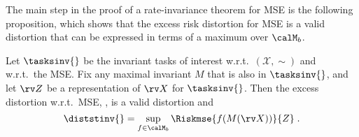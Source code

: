 \documentclass[final]{article}
\begin{document}
The main step in the proof of a rate-invariance theorem for MSE is the following proposition, which shows that the excess risk distortion for MSE is a valid distortion that can be expressed in terms of a maximum over $\calM_b$.










\begin{proposition}\label{appx:prop:invariant_distortion_mse}
Let $\tasksinv{}$ be the invariant tasks of interest w.r.t.\  $(\mathcal{X},\sim)$  and w.r.t.\ the MSE.
Fix any maximal invariant $M$ that is also in $\tasksinv{}$, and let $\rv Z$ be a representation of $\rv X$ for $\tasksinv{}$. 
Then the excess distortion  w.r.t.\ MSE, \disttextinv{}, is a valid distortion and
\begin{equation} \label{eq:mse:distortion}
\diststinv{} = \sup_{f \in \calM_b}  \Riskmse{f(M(\rv X))}{Z} \;.
\end{equation}
\end{proposition}
\end{document}
